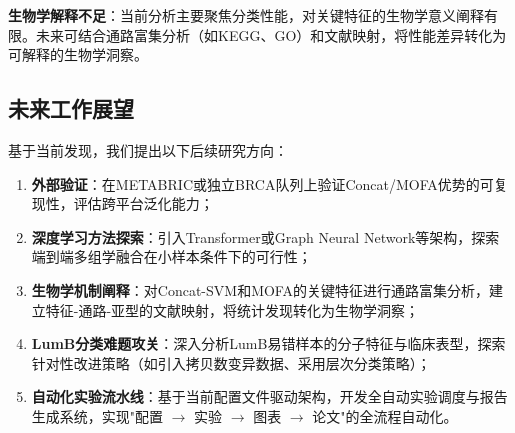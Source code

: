 \textbf{生物学解释不足}：当前分析主要聚焦分类性能，对关键特征的生物学意义阐释有限。未来可结合通路富集分析（如KEGG、GO）和文献映射，将性能差异转化为可解释的生物学洞察。

\subsection{未来工作展望}

基于当前发现，我们提出以下后续研究方向：

\begin{enumerate}
    \item \textbf{外部验证}：在METABRIC或独立BRCA队列上验证Concat/MOFA优势的可复现性，评估跨平台泛化能力；
    \item \textbf{深度学习方法探索}：引入Transformer或Graph Neural Network等架构，探索端到端多组学融合在小样本条件下的可行性；
    \item \textbf{生物学机制阐释}：对Concat-SVM和MOFA的关键特征进行通路富集分析，建立特征-通路-亚型的文献映射，将统计发现转化为生物学洞察；
    \item \textbf{LumB分类难题攻关}：深入分析LumB易错样本的分子特征与临床表型，探索针对性改进策略（如引入拷贝数变异数据、采用层次分类策略）；
    \item \textbf{自动化实验流水线}：基于当前配置文件驱动架构，开发全自动实验调度与报告生成系统，实现"配置 $\to$ 实验 $\to$ 图表 $\to$ 论文"的全流程自动化。
\end{enumerate}
